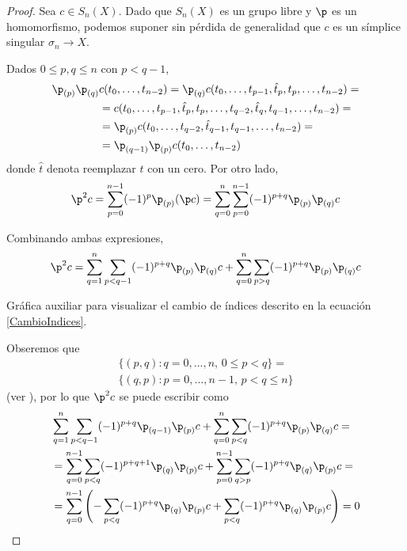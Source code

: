 \begin{proof}
Sea $c \in S_n(X)$.
Dado que $S_n(X)$ es un grupo libre y $\p$ es un homomorfismo, podemos suponer sin pérdida de generalidad que $c$ es un símplice singular $\sigma_n \to X$.

Dados $0 \leq p, q \leq n$ con $p < q-1$,
\begin{align*}
\p_{(p)}\p_{(q)}&c(t_0,\dots,t_{n-2})
	=\p_{(q)}c(t_0,\dots,t_{p-1},\hat t_p,t_p,\dots,t_{n-2})=\\
	&=c(t_0,\dots,t_{p-1},\hat t_p,t_p,\dots,t_{q-2},\hat t_q,t_{q-1},\dots,t_{n-2})=\\
	&=\p_{(p)}c(t_0,\dots,t_{q-2},\hat t_{q-1},t_{q-1},\dots,t_{n-2})=\\
	&=\p_{(q-1)}\p_{(p)}c(t_0,\dots,t_{n-2})
\end{align*}
donde $\hat t$ denota reemplazar $t$ con un cero.
Por otro lado,
\begin{equation}
	\label{Borde2c}
	\p^2c=\sum^{n-1}_{p=0}(-1)^p\p_{(p)}(\p c)=\sum^n_{q=0}\sum^{n-1}_{p=0}(-1)^{p+q}\p_{(p)}\p_{(q)}c
\end{equation}

Combinando ambas expresiones,
	\[\p^2c=\sum_{q=1}^n\sum_{p < q-1}(-1)^{p+q}\p_{(p)}\p_{(q)}c+\sum^n_{q=0}\sum_{p > q}(-1)^{p+q}\p_{(p)}\p_{(q)}c\]
\begin{marginfigure}
	\caption[Gráfica auxiliar que ilustra el cambio de índices.]{Gráfica auxiliar para visualizar el cambio de índices descrito en la ecuación \eqref{CambioIndices}.}
\end{marginfigure}

Obseremos que
\begin{multline} \label{CambioIndices}
	\{(p,q)\colon q=0,\dots,n,\, 0\leq p<q\}=\\
	\{(q,p)\colon p=0,\dots,n-1,\, p < q \leq n\}
\end{multline}
(ver ), por lo que $\p^2c$ se puede escribir como
\begin{align*}
	&\sum_{q=1}^n\sum_{p < q-1}(-1)^{p+q}\p_{(q-1)}\p_{(p)}c+\sum^n_{q=0}\sum_{p < q}(-1)^{p+q}\p_{(p)}\p_{(q)}c=\\ 
	&=\sum_{q=0}^{n-1}\sum_{p < q}(-1)^{p+q+1}\p_{(q)}\p_{(p)}c+\sum^{n-1}_{p=0}\sum_{q > p}(-1)^{p+q}\p_{(q)}\p_{(p)}c=\\
	&=\sum_{q=0}^{n-1}\left(-\sum_{p < q}(-1)^{p+q}\p_{(q)}\p_{(p)}c+\sum_{p < q}(-1)^{p+q}\p_{(q)}\p_{(p)}c\right)=0
\end{align*}
\end{proof}

